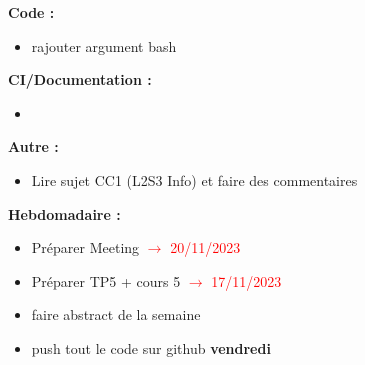 \textbf{Code :}
\begin{itemize}[label=$\square$] 
	\item rajouter argument bash
\end{itemize}
\textbf{CI/Documentation :}
\begin{itemize}[label=$\square$] 
	\item 
\end{itemize}
\textbf{Autre :}
\begin{itemize}[label=$\square$] 
	\item[\done] Lire sujet CC1 (L2S3 Info) et faire des commentaires
\end{itemize}
\textbf{Hebdomadaire :}
\begin{itemize}[label=$\square$] 
	\item Préparer Meeting \textcolor{red}{$\rightarrow$ 20/11/2023}
	\item Préparer TP5 + cours 5 \textcolor{red}{$\rightarrow$ 17/11/2023}
	\item faire abstract de la semaine 
	\item push tout le code sur github \textbf{vendredi}
\end{itemize}